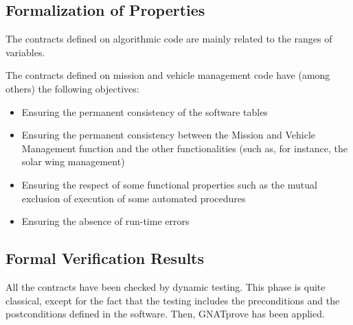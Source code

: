 \documentclass[10pt,a4paper,twocolumn]{article}
\newcommand{\gnatprove}{GNATprove\xspace}
\begin{document}
\subsection{Formalization of Properties}

The contracts defined on algorithmic code are mainly related to the ranges of variables.


The contracts defined on mission and vehicle management code have (among others) the following objectives:

\begin{itemize}
\item Ensuring the permanent consistency of the software tables
\item Ensuring the permanent consistency between the Mission and Vehicle Management function and the other functionalities (such as, for instance, the solar wing management)
\item Ensuring the respect of some functional properties such as the mutual exclusion of execution of some automated procedures
\item Ensuring the absence of run-time errors
\end{itemize}


\subsection{Formal Verification Results}

All the contracts have been checked by dynamic testing. This phase is quite classical, except for the fact that the testing includes the preconditions and the postconditions defined in the software. Then, \gnatprove has been applied.
\end{document}
